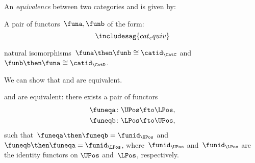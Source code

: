 \begin{definition}
\label{def:equivalence_cat}
An \emph{equivalence} between two categories \CatC and \CatD is given by:
\begin{compactenum}
\item A pair of functors~$\funa,\funb$ of the form:
    \begin{equation}
    \includesag{cat_equiv}
    \end{equation}
\item natural isomorphisms~$\funa\then \funb\cong \catid_\CatC$ and~$\funb\then \funa\cong \catid_\CatD$.
\end{compactenum}
\end{definition}
We can show that \UPos and \LPos are equivalent.

\begin{lemma}
\label{lem:ulposequiv}
\UPos and \LPos are equivalent: there exists a pair of functors
\begin{equation}
    \begin{aligned}
    \funeqa\colon \UPos&\fto \LPos,\\
    \funeqb\colon \LPos&\fto \UPos,
    \end{aligned}
\end{equation}
such that~$\funeqa \then \funeqb=\funid_{\UPos}$ and~$\funeqb \then \funeqa=\funid_{\LPos}$, where~$\funid_{\UPos}$ and~$\funid_{\LPos}$ are the identity functors on $\UPos$ and~$\LPos$, respectively.
\end{lemma}


